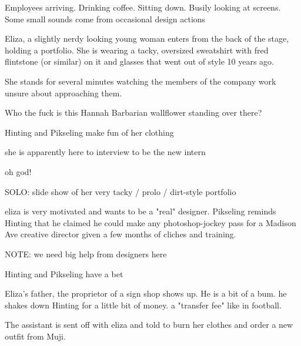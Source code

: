 \act


Employees arriving.  Drinking coffee.  Sitting down. Busily looking at screens.  Some small sounds come from occasional design actions 

Eliza, a slightly nerdy looking young woman enters from the back of the stage, holding a portfolio.  She is wearing a tacky, oversized sweatshirt with fred flintstone (or similar) on it and glasses that went out of style 10 years ago.

She stands for several minutes watching the members of the company work unsure about approaching them.


{Who the fuck is this Hannah Barbarian wallflower standing over there?}

Hinting and Pikseling make fun of her clothing

she is apparently here to interview to be the new intern

oh god!

SOLO: slide show of her very tacky / prolo / dirt-style portfolio 

eliza is very motivated and wants to be a "real" designer.  Pikseling reminds Hinting that he claimed he could make any photoshop-jockey pass for a Madison Ave creative director given a few months of cliches and training.

NOTE: we need big help from designers here

Hinting and Pikseling have a bet

Eliza's father, the proprietor of a sign shop shows up.  He is a bit of a bum.  he shakes down Hinting for a little bit of money. a "transfer fee" like in football.

The assistant is sent off with eliza and told to burn her clothes and order a new outfit from Muji.
